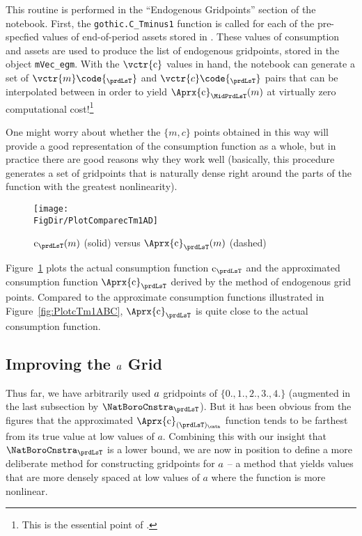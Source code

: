 This routine is performed in the ``Endogenous Gridpoints'' section of the notebook. First, the \texttt{gothic.C\_Tminus1} function is called for each of the pre-specfied values of end-of-period assets stored in . These values of consumption and assets are used to produce the list of endogenous gridpoints, stored in the object \texttt{mVec\_egm}. With the $\vctr{\cFunc}$ values in hand, the notebook can generate a set of $\vctr{{m}}\code{_{\prdLsT}}$ and ${\vctr{{\cNrm}}\code{_{\prdLsT}}}$ pairs that can be interpolated between in order to yield $\Aprx{\cFunc}_{\MidPrdLsT}(\mNrm)$ at virtually zero computational cost!\footnote{This is the essential point of \cite{carrollEGM}.} %

\hypertarget{PlotComparecTm1AD}{}
One might worry about whether the $\{{m},{c}\}$ points obtained in this way will provide a good representation of the consumption function as a whole, but in practice there are good reasons why they work well (basically, this procedure generates a set of gridpoints that is naturally dense right around the parts of the function with the greatest nonlinearity).
\begin{figure}
  \centerline{\texttt{[image: \\FigDir/PlotComparecTm1AD]}}
  \caption{$\cFunc_{\prdLsT}({m})$ (solid) versus $\Aprx{\cFunc}_{\prdLsT}({m})$ (dashed)}
  \label{fig:ComparecTm1AD}
\end{figure}
Figure~\ref{fig:ComparecTm1AD} plots the actual consumption function ${\cFunc}_{\prdLsT}$ and the approximated consumption function $\Aprx{\cFunc}_{\prdLsT}$ derived by the method of endogenous grid points. Compared to the approximate consumption functions illustrated in Figure~\ref{fig:PlotcTm1ABC}, $\Aprx{\cFunc}_{\prdLsT}$ is quite close to the actual consumption function.



\hypertarget{improving-the-a-grid}{}
\subsection{Improving the $a$ Grid}\label{subsec:improving-the-a-grid}

Thus far, we have arbitrarily used $a$ gridpoints of $\{0.,1.,2.,3.,4.\}$ (augmented in the last subsection by $\NatBoroCnstra_{\prdLsT}$).  But it has been obvious from the figures that the approximated $\Aprx{\cFunc}_{({\prdLsT})_\cntn}$ function tends to be farthest from its true value at low values of ${a}$.  Combining this with our insight that $\NatBoroCnstra_{\prdLsT}$ is a lower bound, we are now in position to define a more deliberate method for constructing gridpoints for $a$ -- a method that yields values that are more densely spaced at low values of ${a}$ where the function is more nonlinear.

